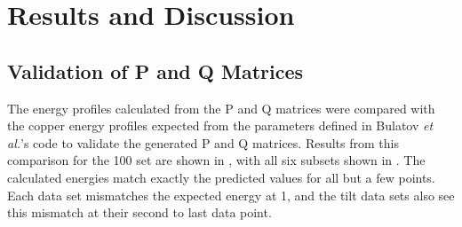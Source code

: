 \documentclass[12pt]{report}
\begin{document}
\chapter{Results and Discussion\label{results}}
\section{Validation of P and Q Matrices\label{results:PQValid}}
The energy profiles calculated from the P and Q matrices were compared with the copper energy profiles expected from the parameters defined in Bulatov \emph{et al.}'s code to validate the generated P and Q matrices.  Results from this comparison for the \textlangle{}100\textrangle{} set are shown in , with all six subsets shown in .  The calculated energies match exactly the predicted values for all but a few points.  Each data set mismatches the expected energy at 1\textdegree{}, and the tilt data sets also see this mismatch at their second to last data point.
\end{document}
